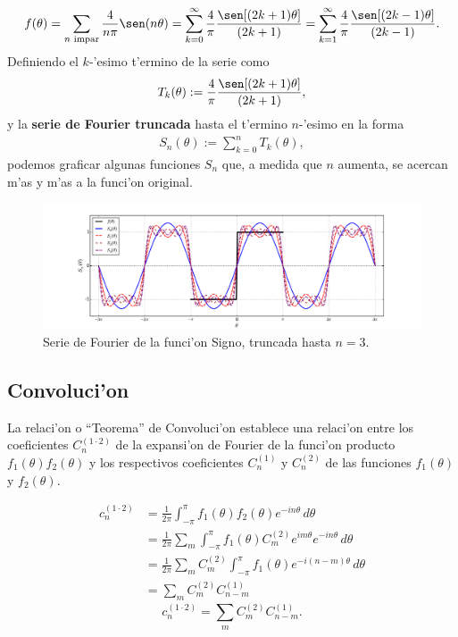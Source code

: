 \begin{align}
f(\theta)=\sum_{n\text{ impar}}\frac{4}{n\pi}\sen(n\theta)=\sum_{k=0}^{\infty}\frac{4}{\pi}\frac{\sen[(2k+1)\theta]}{(2k+1)}=\sum_{k=1}^{\infty}\frac{4}{\pi}\frac{\sen[(2k-1)\theta]}{(2k-1)}.
\end{align}
Definiendo el $k$-'esimo t'ermino de la serie como 
\begin{align}
T_{k}(\theta):=\frac{4}{\pi}\frac{\sen[(2k+1)\theta]}{(2k+1)},
\end{align}
y la \textbf{serie de Fourier truncada} hasta el t'ermino $n$-'esimo en la forma
\begin{align}
S_n(\theta):=\sum_{k=0}^n T_{k}(\theta),
\end{align}
podemos graficar algunas funciones $S_n$ que, a medida que $n$ aumenta, se acercan m'as y m'as a la funci'on original.
\begin{figure}[h]
\centering
\includegraphics[scale=0.4]{figs/fig-Fourier-serie-signo.pdf}
\caption{Serie de Fourier de la funci'on Signo, truncada hasta $n=3$.}
\label{im:signo}
\end{figure}

\subsection{Convoluci'on}

La relaci'on o ``Teorema'' de Convoluci'on establece una relaci'on entre los coeficientes $C_{n}^{(1\cdot 2)}$ de la expansi'on de Fourier de la funci'on producto $f_1(\theta)f_2(\theta)$ y los respectivos coeficientes $C_{n}^{(1)}$ y $C_{n}^{(2)}$ de las funciones $f_1(\theta)$ y $f_2(\theta)$.

\begin{align}
c_n^{(1\cdot 2)} &= \frac{1}{2\pi}\int_{-\pi}^\pi f_1(\theta)f_2(\theta)e^{-in\theta}\,d\theta \\
 &= \frac{1}{2\pi}\sum_m \int_{-\pi}^\pi f_1(\theta)C_m^{(2)}e^{im\theta}e^{-in\theta}\,d\theta \\
 &= \frac{1}{2\pi}\sum_m C_m^{(2)}\int_{-\pi}^\pi f_1(\theta)e^{-i(n-m)\theta}\,d\theta \\
 &= \sum_m C_m^{(2)}C_{n-m}^{(1)}
\end{align}
\begin{equation}\label{conv}
\boxed{c_n^{(1\cdot 2)} = \sum_m C_m^{(2)}C_{n-m}^{(1)}.}
\end{equation}


